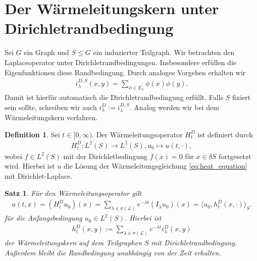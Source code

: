 \documentclass[headsepline,11pt]{scrbook}
\newtheorem{thm}[lem]{Satz}
\theoremstyle{definition}
\newtheorem{df}[lem]{Definition}
\begin{document}
\section{Der W\"armeleitungskern unter Dirichletrandbedingung}

Sei $ G  $ ein Graph und $ S \leq G $ ein induzierter Teilgraph.
Wir betrachten den Laplaceoperator unter Dirichletrandbedingungen. Insbesondere erf\"ullen die Eigenfunktionen diese Randbedingung.
Durch analoges Vorgehen erhalten wir 
\begin{align}
i_\lambda^{D,S}(x,y)
=
\sum \limits_{\phi \in E_\lambda}
\phi(x) \phi(y).
\end{align}
Damit ist hierf\"ur automatisch die Dirichletrandbedingung erf\"ullt.
Falls $ S $ fixiert sein sollte, schreiben wir auch
$ i_\lambda^D := i_\lambda^{D,S} $.
Analog werden wir bei dem W\"armeleitungskern verfahren.

\begin{df}
	Sei $ t \in [0,\infty) $.
	Der W\"armeleitungsoperator $ H_t^D $ ist definiert durch
	\begin{align}
	H_t^D : L^2(S) \to L^2(S),
	u_0 \mapsto u(t,\cdot ),
	\end{align}
	wobei $ f \in  L^2(S) $ mit der Dirichletbedingung $ f(x) = 0 $ f\"ur $ x \in \delta S $ fortgesetzt wird.
	Hierbei ist $ u $ die L\"osung der W\"armeleitungsgleichung
	\eqref{eq:heat_equation} mit Dirichlet-Laplace.
\end{df}

 

\begin{thm}\label{th:repres_heat_kernel_dirichlet}
	F\"ur den W\"armeleitungsoperator gilt
	\begin{align}\label{eq:heat_kernel_def_dirichlet}
	u(t,x ) = (H_t^D u_0)(x) = 
	\sum \limits_{\lambda \in \sigma(\mathcal{L})} e^{- \lambda t } (I_\lambda u_0) (x) 
	=
	\langle u_0 ,h_t^D(x,\cdot) \rangle_S.
	\end{align}
	f\"ur die Anfangsbedingung $ u_0 \in L^2(S) $.
	Hierbei ist
	\begin{align}
	h_t^D(x,y) := \sum \limits_{\lambda \in \sigma(\mathcal{L})}
	e^{- \lambda t} i^D_\lambda(x,y) 
	\end{align}
	der W\"armeleitungskern auf dem Teilgraphen $ S $ mit Dirichletrandbedingung.
	Au\ss{}erdem bleibt die Randbedingung unabh\"angig von der Zeit erhalten.
\end{thm}
\end{document}

